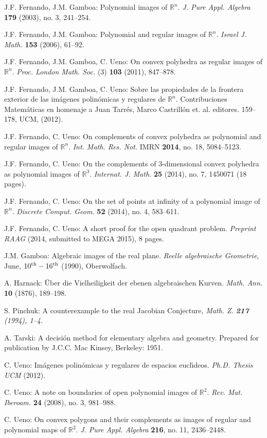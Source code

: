 \documentclass[10pt,twoside]{homg3} %
\renewcommand{\R}{\mathbb{R}}
\begin{document}
 J.F. Fernando, J.M. Gamboa: Polynomial images of $\R^n$. {\em J. Pure Appl. Algebra} {\bf179} (2003), no. 3, 241--254.

 J.F. Fernando, J.M. Gamboa: Polynomial and regular images of $\R^n$. {\em Israel J. Math.} {\bf153} (2006), 61--92.

 J.F. Fernando, J.M. Gamboa, C. Ueno: On convex polyhedra as regular images of $\R^n$. {\em Proc. London Math. Soc.} (3) {\bf103} (2011), 847--878.

 J.F. Fernando, J.M. Gamboa, C. Ueno: Sobre las propiedades de la frontera exterior de las im\'agenes polin\'omicas y regulares de $\R^n$. {Contribuciones Matem\'aticas en homenaje a Juan Tarr\'es}, Marco Castrill\'on et. al. editores. 159--178, UCM, (2012).

 J.F. Fernando, C. Ueno: On complements of convex polyhedra as polynomial and regular images of $\R^n$. {\em Int. Math. Res. Not.} IMRN {\bf 2014}, no. 18, 5084--5123.

 J.F. Fernando, C. Ueno: On the complements of $3$-dimensional convex polyhedra as polynomial images of $\R^3$. {\em Internat. J. Math.} {\bf 25} (2014), no. 7, 1450071 (18 pages).

 J.F. Fernando, C. Ueno: On the set of points at infinity of a polynomial image of $\R^n$. {\em Discrete Comput. Geom.} {\bf 52} (2014), no. 4, 583--611.

 J.F. Fernando, C. Ueno: A short proof for the open quadrant problem. {\em Preprint RAAG} (2014, submitted to MEGA 2015), 8 pages.

 J.M. Gamboa: Algebraic images of the real plane. {\em Reelle algebraische Geometrie}, June, $10^{\rm th}-16^{\rm th}$ (1990), Oberwolfach.

 A. Harnack: \"Uber die Vielheiligkeit der ebenen algebraischen Kurven. {\em Math. Ann.} {\bf10} (1876), 189--198.

 S. Pinchuk: A counterexample to the real Jacobian Conjecture, \em Math. Z.
\em {\bf 217} (1994), 1--4.

 A. Tarski: A decisi\'on method for elementary algebra and geometry. Prepared for publication by J.C.C. Mac Kinsey, Berkeley: 1951.

 C. Ueno: Im\'agenes polin\'omicas y regulares de espacios eucl\'\i deos. {\em Ph.D. Thesis UCM} (2012).

 C. Ueno: A note on boundaries of open polynomial images of $\R^2$. {\em Rev. Mat. Iberoam.} {\bf24} (2008), no. 3, 981--988.

 C. Ueno: On convex polygons and their complements as images of regular and polynomial maps of $\R^2$. {\em J. Pure Appl. Algebra} {\bf216}, no. 11, 2436--2448.

\endDocument %
\end{document}
